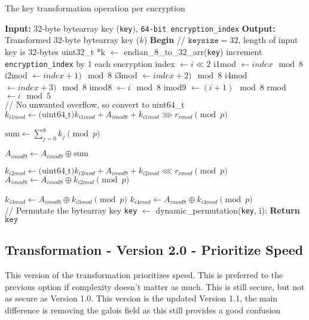 \documentclass[fleqn, a4paper,12pt]{article}
\newcommand{\COMMENT}[1]{\State \textcolor[HTML]{003e57}{// #1}}
\begin{document}
\begin{algorithm}[H] %
\caption{The key transformation operation per encryption}
\begin{algorithmic}[1]  %
\State \textbf{Input:} 32-byte bytearray key (\texttt{key}), \texttt{64-bit encryption\_index}
\State \textbf{Output:} Transformed 32-byte bytearray key ($k$)
\State \textbf{Begin}
\COMMENT{$\texttt{keysize} = 32$, length of input key is 32-bytes}
\State uint32\_t *k $\gets$ endian\_8\_to\_32\_arr(\texttt{key})
\State increment \texttt{encryption\_index} by 1 each encryption
	\State index $\gets i \ll 2$
	\State i1mod $\gets index \mod 8$
	\State i2mod $\gets index+1) \mod 8$
	\State i3mod $\gets index+2) \mod 8$
	\State i4mod $\gets index+3) \mod 8$
	\State imod8 $\gets i \mod 8$
	\State imod9 $\gets (i+1) \mod 8$
	\State rmod $\gets i \mod 5$ \\

	\COMMENT{No unwanted overflow, so convert to uint64\_t}
	\State $k_{i1mod} \gets \text{(uint64\_t)} k_{i1mod} + A_{imod8} + k_{i1mod} \ggg r_{rmod}  \pmod p $

	\State $ \text{sum} \gets \displaystyle \sum_{j=0}^8 k_j \pmod p $

	\State $A_{imod9} \gets A_{imod9} \oplus \text{sum}$

	\State $k_{i2mod} \gets \text{(uint64\_t)} k_{i2mod} + A_{imod9} + k_{i2mod} \lll r_{rmod} \pmod p$
	\State $A_{imod8} \gets A_{imod8} \oplus k_{i2mod} \pmod p$

	\State $k_{i3mod} \gets A_{imod8} \oplus k_{i3mod} \pmod p$
	\State $k_{i4mod} \gets A_{imod8} \oplus k_{i4mod} \pmod p$ \\

	\COMMENT{Permutate the bytearray key}
	\State \texttt{key} $\gets$ dynamic\_permutation(\texttt{key}, i);
\EndFor
\State \textbf{Return} $\texttt{key}$
\end{algorithmic}
\end{algorithm}

\subsection{Transformation - Version 2.0 - Prioritize Speed}

This version of the transformation prioritizes speed. This is preferred to the previous option if complexity doesn't matter as much. This is still secure, but not as secure as Version 1.0. This version is the updated Version 1.1, the main difference is removing the galois field as this still provides a good confusion
\end{document}
